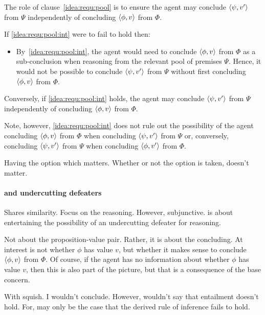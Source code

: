 \begin{note}
  The role of clause~\ref{idea:requ:pool} is to ensure the agent may conclude \(\langle \psi, v' \rangle\) from \(\Psi\) independently of concluding \(\langle \phi, v \rangle\) from \(\Phi\).

  If \ref{idea:requ:pool:int} were to fail to hold then:
  \begin{itemize}
  \item
    By~\ref{idea:requ:pool:int}, the agent would need to conclude \(\langle \phi, v \rangle\) from \(\Phi\) as a sub-conclusion when reasoning from the relevant pool of premises \(\Psi\).
    Hence, it would not be possible to conclude \(\langle \psi, v' \rangle\) from \(\Psi\) without first concluding \(\langle \phi, v \rangle\) from \(\Phi\).
  \end{itemize}

  Conversely, if \ref{idea:requ:pool:int} holds, the agent may conclude \(\langle \psi, v' \rangle\) from \(\Psi\) independently of concluding \(\langle \phi, v \rangle\) from \(\Phi\).

  Note, however, \ref{idea:requ:pool:int} does not rule out the possibility of the agent concluding \(\langle \phi, v \rangle\) from \(\Phi\) when concluding \(\langle \psi, v' \rangle\) from \(\Psi\) or, conversely, concluding \(\langle \psi, v' \rangle\) from \(\Psi\) when concluding \(\langle \phi, v' \rangle\) from \(\Phi\).

  Having the option which matters.
  Whether or not the option is taken, doesn't matter.
\end{note}

\paragraph{ and undercutting defeaters}

\begin{note}
  Shares similarity.
  Focus on the reasoning.
  However, subjunctive.
  \qzS{} is about entertaining the possibility of an undercutting defeater for reasoning.
\end{note}

\begin{note}
  Not about the proposition-value pair.
  Rather, it is about the concluding.
  At interest is not whether \(\phi\) has value \(v\), but whether it makes sense to conclude \(\langle \phi, v \rangle\) from \(\Phi\).
  Of course, if the agent has no information about whether \(\phi\) has value \(v\), then this is also part of the picture, but that is a consequence of the base concern.

  With squish.
  I wouldn't conclude.
  However, wouldn't say that entailment doesn't hold.
  For, may only be the case that the derived rule of inference fails to hold.
\end{note}

